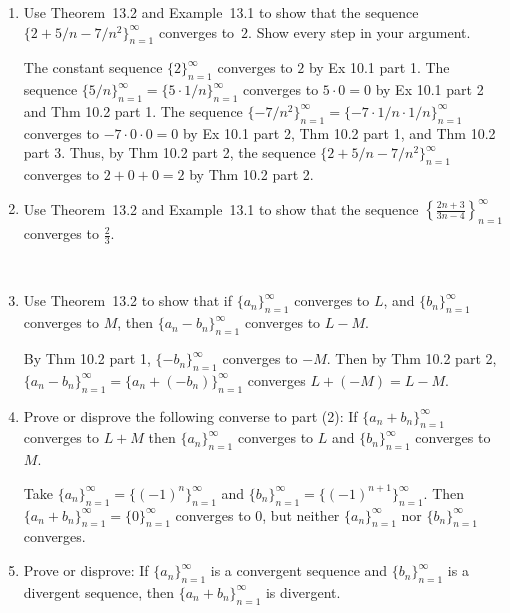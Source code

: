 \documentclass[12pt]{amsart}
\numberwithin{equation}{section}
\theoremstyle{plain} %
\theoremstyle{definition}
\theoremstyle{remark}
\begin{document}
\begin{enumerate}
\item Use Theorem~13.2 and Example~13.1 to show that the sequence $\{2 + 5/n - 7/n^2\}_{n=1}^\infty$ converges to~$2$. Show every step in your argument.

\begin{framed}
The constant sequence $\{2\}_{n=1}^\infty$ converges to $2$ by Ex 10.1 part 1. The sequence $\{5/n\}_{n=1}^\infty = \{5 \cdot 1/n\}_{n=1}^\infty$ converges to $5\cdot 0 = 0$ by Ex 10.1 part 2 and Thm 10.2 part 1. The sequence $\{ -7/n^2\}_{n=1}^\infty = \{ -7 \cdot 1/n \cdot 1/n\}_{n=1}^\infty$ converges to $-7 \cdot 0 \cdot 0 = 0$ by Ex 10.1 part 2, Thm 10.2 part 1, and Thm 10.2 part 3. Thus, by Thm 10.2 part 2, the sequence $\{ 2 + 5/n - 7/n^2\}_{n=1}^\infty$ converges to $2+0+0 = 2$ by Thm 10.2 part 2.
\end{framed}


\item Use Theorem~13.2 and Example~13.1 to show that the sequence $\displaystyle \left\{\frac{2n+3}{3n-4}\right\}_{n=1}^\infty$ converges to $\displaystyle\frac23$.




\

\item Use Theorem~13.2 to show that if $\{a_n\}_{n=1}^\infty$ converges to $L$, and $\{b_n\}_{n=1}^\infty$ converges to $M$, then ${\{a_n - b_n\}_{n=1}^\infty}$ converges to $L-M$.

\begin{framed}
By Thm 10.2 part 1, $\{-b_n\}_{n=1}^\infty$ converges to $-M$. Then by Thm 10.2 part 2, $\{a_n - b_n\}_{n=1}^\infty = \{a_n + (- b_n)\}_{n=1}^\infty$ converges $L+(-M) = L-M$.
\end{framed}


\item Prove or disprove the following converse to part (2): If $\{ a_n + b_n \}_{n=1}^\infty$ converges to $L+M$ then $\{a_n \}_{n=1}^\infty$ converges to $L$ and $\{ b_n \}_{n=1}^\infty$ converges to $M$.

\begin{framed}
Take $\{ a_n\}_{n=1}^\infty = \{ (-1)^n\}_{n=1}^\infty$ and $\{ b_n \}_{n=1}^\infty = \{ (-1)^{n+1} \}_{n=1}^\infty$. Then $\{ a_n + b_n\}_{n=1}^\infty = \{ 0 \}_{n=1}^\infty$ converges to $0$, but neither $\{a_n\}_{n=1}^\infty$ nor $\{b_n\}_{n=1}^\infty$ converges.
\end{framed}

\item Prove or disprove: If $\{a_n\}_{n=1}^\infty$ is a convergent sequence and $\{b_n\}_{n=1}^\infty$ is a divergent sequence, then $\{a_n + b_n\}_{n=1}^{\infty}$ is divergent.


\end{enumerate}
\end{document}
